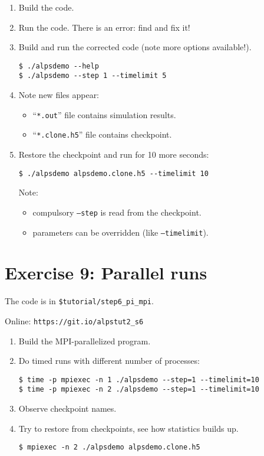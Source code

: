 \documentclass[12pt]{article}
\newcommand{\code}[1]{\texttt{#1}}
\begin{document}
\begin{enumerate}
\item Build the code.
\item Run the code. There is an error: find and fix it!
\item Build and run the corrected code (note more options available!).
  \begin{lstlisting}
$ ./alpsdemo --help
$ ./alpsdemo --step 1 --timelimit 5
  \end{lstlisting}
\item Note new files appear:
  \begin{itemize}
  \item  ``\code{*.out}'' file contains simulation results.
  \item  ``\code{*.clone.h5}'' file contains checkpoint.
  \end{itemize}
\item Restore the checkpoint and run for 10 more seconds:
  \begin{lstlisting}
$ ./alpsdemo alpsdemo.clone.h5 --timelimit 10 
\end{lstlisting} %
Note:
  \begin{itemize}
  \item compulsory \code{--step} is read from the checkpoint.
  \item parameters can be overridden (like \code{--timelimit}).
  \end{itemize}
\end{enumerate}


\section*{Exercise 9: Parallel runs}

The code is in \texttt{\color{ballblue}\$tutorial/step6\_pi\_mpi}.

Online: \nolinkurl{https://git.io/alpstut2_s6}

\begin{enumerate}
\item Build the MPI-parallelized program.
\item Do timed runs with different number of processes:
  \begin{lstlisting}[emph={mpiexec}]
$ time -p mpiexec -n 1 ./alpsdemo --step=1 --timelimit=10
$ time -p mpiexec -n 2 ./alpsdemo --step=1 --timelimit=10
  \end{lstlisting} %
\item Observe checkpoint names.
\item Try to restore from checkpoints, see how statistics builds up.
  \begin{lstlisting}[emph={mpiexec}]
$ mpiexec -n 2 ./alpsdemo alpsdemo.clone.h5
\end{lstlisting} %
\end{enumerate}
\end{document}
